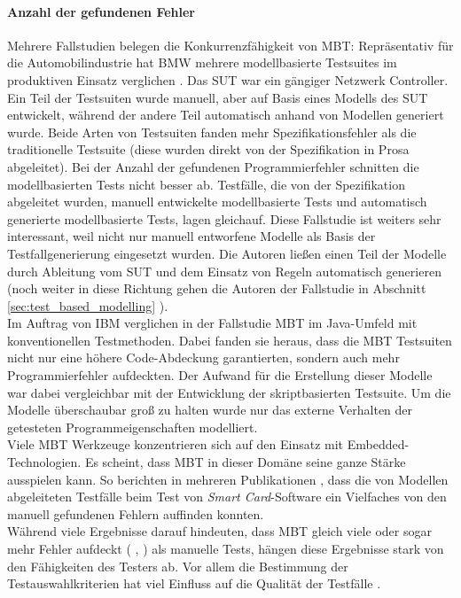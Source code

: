 \paragraph{Anzahl der gefundenen Fehler} Mehrere Fallstudien belegen die Konkurrenzfähigkeit von MBT: Repräsentativ für die Automobilindustrie hat BMW mehrere modellbasierte Testsuites im produktiven Einsatz verglichen \cite{pretschner_one_2005}. Das \Gls{SUT} war ein gängiger Netzwerk Controller. Ein Teil der Testsuiten wurde manuell, aber auf Basis eines Modells des \Gls{SUT} entwickelt, während der andere Teil automatisch anhand von Modellen generiert wurde. Beide Arten von Testsuiten fanden mehr Spezifikationsfehler als die traditionelle Testsuite (diese wurden direkt von der Spezifikation in Prosa abgeleitet). Bei der Anzahl der gefundenen Programmierfehler schnitten die modellbasierten Tests nicht besser ab. Testfälle, die von der Spezifikation abgeleitet wurden, manuell entwickelte modellbasierte Tests und automatisch generierte modellbasierte Tests, lagen gleichauf. Diese Fallstudie ist weiters sehr interessant, weil nicht nur manuell entworfene Modelle als Basis der Testfallgenerierung eingesetzt wurden. Die Autoren ließen einen Teil der Modelle durch Ableitung vom \Gls{SUT} und dem Einsatz von Regeln automatisch generieren (noch weiter in diese Richtung gehen die Autoren der Fallstudie in Abschnitt \ref{sec:test_based_modelling} ).\\
Im Auftrag von IBM verglichen \citeauthor{farchi_using_2002} in der Fallstudie \cite{farchi_using_2002} \Gls{MBT} im Java-Umfeld mit konventionellen Testmethoden. Dabei fanden sie heraus, dass die \Gls{MBT} Testsuiten nicht nur eine höhere Code-Abdeckung garantierten, sondern auch mehr Programmierfehler aufdeckten. Der Aufwand für die Erstellung dieser Modelle war dabei vergleichbar mit der Entwicklung der skriptbasierten Testsuite. Um die Modelle überschaubar groß zu halten wurde nur das externe Verhalten der getesteten Programmeigenschaften modelliert.\\
Viele \Gls{MBT} Werkzeuge konzentrieren sich auf den Einsatz mit Embedded-Technologien. Es scheint, dass \Gls{MBT} in dieser Domäne seine ganze Stärke ausspielen kann. So berichten \citeauthor{legeard_generation_2001} in mehreren Publikationen \cite{legeard_generation_2001}, dass die von Modellen abgeleiteten Testfälle beim Test von \textit{Smart Card}-Software ein Vielfaches von den manuell gefundenen Fehlern auffinden konnten.\\
Während viele Ergebnisse darauf hindeuten, dass \Gls{MBT} gleich viele oder sogar mehr Fehler aufdeckt ( \cite{dalal_model-based_1999}, \cite{legeard_generation_2001}) als manuelle Tests, hängen diese Ergebnisse stark von den Fähigkeiten des Testers ab. Vor allem die Bestimmung der Testauswahlkriterien hat viel Einfluss auf die Qualität der Testfälle \cite{utting_practical_2007}.


